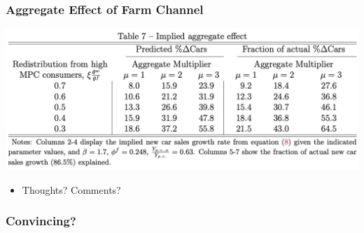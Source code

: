 \documentclass[english,xcolor=svgnames]{beamer}
\begin{document}
\begin{frame}
\frametitle[alignment=center]{Aggregate Effect of Farm Channel}
\centering
\includegraphics[scale=0.4]{figures/HRWTAB7.png}
\begin{itemize}
	\item Thoughts? Comments?
\end{itemize}
\end{frame}

\begin{frame}
\frametitle[alignment=center]{Convincing?}

\end{frame}




\end{document}
